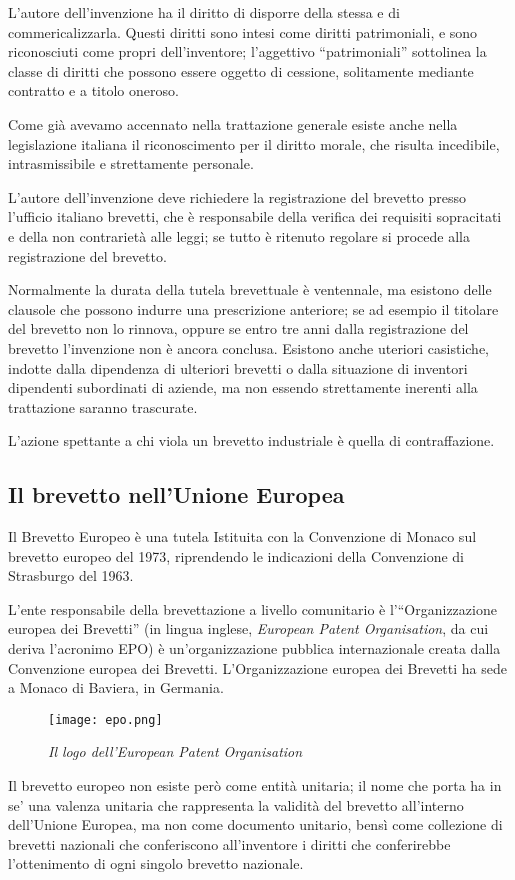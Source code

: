 L'autore dell'invenzione ha il diritto di disporre della stessa e di commericalizzarla. Questi diritti sono intesi come diritti patrimoniali, e sono riconosciuti come propri dell'inventore; l'aggettivo ``patrimoniali'' sottolinea la classe di diritti che possono essere oggetto di cessione, solitamente mediante contratto e a titolo oneroso.

Come già avevamo accennato nella trattazione generale esiste anche nella legislazione italiana il riconoscimento per il diritto morale, che risulta incedibile, intrasmissibile e strettamente personale. 

L'autore dell'invenzione deve richiedere la registrazione del brevetto presso l'ufficio italiano brevetti, che è responsabile della verifica dei requisiti sopracitati e della non contrarietà alle leggi; se tutto è ritenuto regolare si procede alla registrazione del brevetto.

Normalmente la durata della tutela brevettuale è ventennale, ma esistono delle clausole che possono indurre una prescrizione anteriore; se ad esempio il titolare del brevetto non lo rinnova, oppure se entro tre anni dalla registrazione del brevetto l'invenzione non è ancora conclusa. Esistono anche uteriori casistiche, indotte dalla dipendenza di ulteriori brevetti o dalla situazione di inventori dipendenti subordinati di aziende, ma non essendo strettamente inerenti alla trattazione saranno trascurate.

L'azione spettante a chi viola un brevetto industriale è quella di contraffazione.

\subsection{Il brevetto nell'Unione Europea}
Il Brevetto Europeo è una tutela Istituita con la Convenzione di Monaco sul brevetto europeo del 1973, riprendendo le indicazioni della Convenzione di Strasburgo del 1963. 

L'ente responsabile della brevettazione a livello comunitario è l'``Organizzazione europea dei Brevetti'' (in lingua inglese, \textit{European Patent Organisation}, da cui deriva l'acronimo EPO) è un'organizzazione pubblica internazionale creata dalla Convenzione europea dei Brevetti. L'Organizzazione europea dei Brevetti ha sede a Monaco di Baviera, in Germania.
\begin{figure}[hb]
\centering
	\texttt{[image: epo.png]}
\caption{\textit{Il logo dell'European Patent Organisation}}
\end{figure}
Il brevetto europeo non esiste però come entità unitaria; il nome che porta ha in se' una valenza unitaria che rappresenta la validità del brevetto all'interno dell'Unione Europea, ma non come documento unitario, bensì come collezione di brevetti nazionali che conferiscono all'inventore i diritti che conferirebbe l'ottenimento di ogni singolo brevetto nazionale.  

